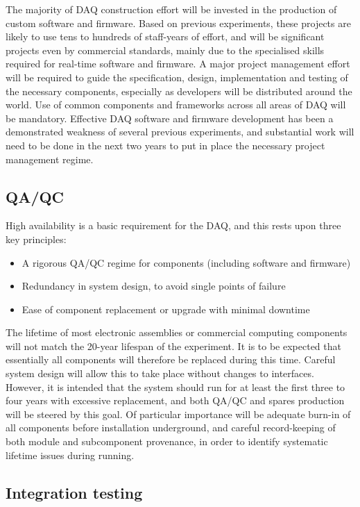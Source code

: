 The majority of DAQ construction effort will be invested in the production of custom software and firmware. Based on previous experiments, these projects are likely to use tens to hundreds of staff-years of effort, and will be significant projects even by commercial standards, mainly due to the specialised skills required for real-time software and firmware. A major project management effort will be required to guide the specification, design, implementation and testing of the necessary components, especially as developers will be distributed around the world. Use of common components and frameworks across all areas of DAQ will be mandatory. Effective DAQ software and firmware development has been a demonstrated weakness of several previous experiments, and substantial work will need to be done in the next two years to put in place the necessary project management regime.

\subsection{QA/QC}

High availability is a basic requirement for the DAQ, and this rests upon three key principles:

\begin{itemize}
	\item A rigorous QA/QC regime for components (including software and firmware)
	\item Redundancy in system design, to avoid single points of failure
	\item Ease of component replacement or upgrade with minimal downtime
\end{itemize}

The lifetime of most electronic assemblies or commercial computing components will not match the 20-year lifespan of the experiment. It is to be expected that essentially all components will therefore be replaced during this time. Careful system design will allow this to take place without changes to interfaces. However, it is intended that the system should run for at least the first three to four years with excessive replacement, and both QA/QC and spares production will be steered by this goal. Of particular importance will be adequate burn-in of all components before installation underground, and careful record-keeping of both module and subcomponent provenance, in order to identify systematic lifetime issues during running.

\subsection{Integration testing}

